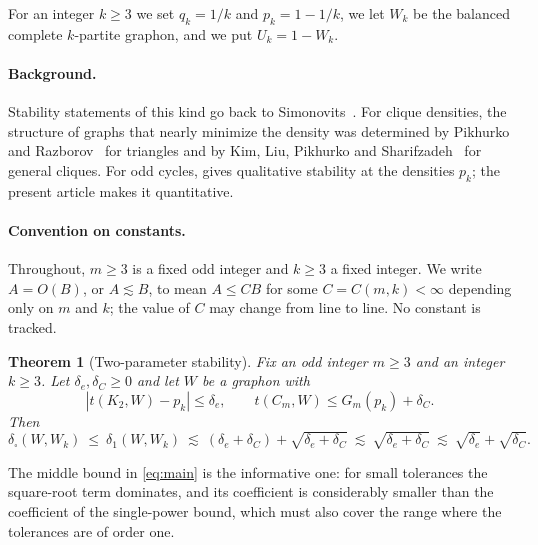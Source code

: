 \documentclass[11pt]{article}
\newtheorem{theorem}{Theorem}[section]
\theoremstyle{remark}
\newcommand{\dsq}{\delta_{\square}}
\newcommand{\abs}[1]{\left\lvert #1\right\rvert}
\begin{document}
For an integer $k\geq3$ we set $q_k=1/k$ and $p_k=1-1/k$, we let $W_k$ be
the balanced complete $k$-partite graphon, and we put $U_k=1-W_k$.

\paragraph{Background.}
Stability statements of this kind go back to Simonovits~\cite{simonovits1968method}. For clique densities, the structure of graphs that nearly minimize the density was determined by Pikhurko and Razborov~\cite{pikhurko2017asymptotic} for triangles and by Kim, Liu, Pikhurko and Sharifzadeh~\cite{kim2020asymptotic} for general cliques. For odd cycles, \cite[Corollary~6.3]{kim2026goodman} gives qualitative stability at the densities $p_k$; the present article makes it quantitative.

\paragraph{Convention on constants.}
Throughout, $m\geq3$ is a fixed odd integer and $k\geq3$ a fixed integer.
We write $A=O(B)$, or $A\lesssim B$, to mean $A\leq CB$ for some
$C=C(m,k)<\infty$ depending only on $m$ and $k$; the value of $C$ may
change from line to line. No constant is tracked.

\begin{theorem}[Two-parameter stability]
\label{thm:main}
Fix an odd integer $m\geq3$ and an integer $k\geq3$. Let
$\delta_e,\delta_C\geq0$ and let $W$ be a graphon with
\begin{equation}\label{eq:hypotheses}
 \abs{t(K_2,W)-p_k}\leq\delta_e,
 \qquad
 t(C_m,W)\leq G_m(p_k)+\delta_C.
\end{equation}
Then
\begin{equation}\label{eq:main}
 \dsq(W,W_k)\ \leq\ \delta_1(W,W_k)
 \ \lesssim\ (\delta_e+\delta_C)+\sqrt{\delta_e+\delta_C}
 \ \lesssim\ \sqrt{\delta_e+\delta_C}
 \ \lesssim\ \sqrt{\delta_e}+\sqrt{\delta_C}.
\end{equation}
\end{theorem}

The middle bound in \eqref{eq:main} is the informative one: for small
tolerances the square-root term dominates, and its coefficient is
considerably smaller than the coefficient of the single-power bound,
which must also cover the range where the tolerances are of order one.
\end{document}

